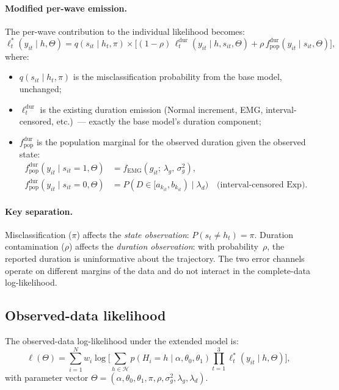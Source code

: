\documentclass[12pt]{article}
\begin{document}
\paragraph{Modified per-wave emission.}
The per-wave contribution to the individual likelihood becomes:
\begin{equation}
\ell^*_t(y_{it} \mid h, \Theta) = q(s_{it} \mid h_t, \pi) \times \Big[(1 - \rho)\,\ell^{\mathrm{dur}}_t(y_{it} \mid h, s_{it}, \Theta) + \rho\,f^{\mathrm{dur}}_{\mathrm{pop}}(y_{it} \mid s_{it}, \Theta)\Big],
\label{eq:emission_rho}
\end{equation}
where:
\begin{itemize}
\item \(q(s_{it} \mid h_t, \pi)\) is the misclassification probability from the base model, unchanged;
\item \(\ell^{\mathrm{dur}}_t\) is the existing duration emission (Normal increment, EMG, interval-censored, etc.)\ --- exactly the base model's duration component;
\item \(f^{\mathrm{dur}}_{\mathrm{pop}}\) is the population marginal for the observed duration given the observed state:
\begin{align}
f^{\mathrm{dur}}_{\mathrm{pop}}(y_{it} \mid s_{it} = 1, \Theta) &= f_{\mathrm{EMG}}(g_{it};\, \lambda_g,\, \sigma^2_g), \label{eq:fpop_g} \\
f^{\mathrm{dur}}_{\mathrm{pop}}(y_{it} \mid s_{it} = 0, \Theta) &= P(D \in [a_{k_{it}}, b_{k_{it}}) \mid \lambda_d) \quad \text{(interval-censored Exp)}. \label{eq:fpop_d}
\end{align}
\end{itemize}

\paragraph{Key separation.} Misclassification (\(\pi\)) affects the \emph{state observation}: \(P(s_t \neq h_t) = \pi\). Duration contamination (\(\rho\)) affects the \emph{duration observation}: with probability~\(\rho\), the reported duration is uninformative about the trajectory. The two error channels operate on different margins of the data and do not interact in the complete-data log-likelihood.

\subsection{Observed-data likelihood}

The observed-data log-likelihood under the extended model is:
\begin{equation}
\ell(\Theta) = \sum_{i=1}^N w_i \log\bigg[\sum_{h \in \mathcal{H}} p(H_i = h \mid \alpha, \theta_0, \theta_1) \prod_{t=1}^3 \ell^*_t(y_{it} \mid h, \Theta)\bigg],
\label{eq:obs_ll_rho}
\end{equation}
with parameter vector \(\Theta = (\alpha, \theta_0, \theta_1, \pi, \rho, \sigma^2_g, \lambda_g, \lambda_d)\).
\end{document}

